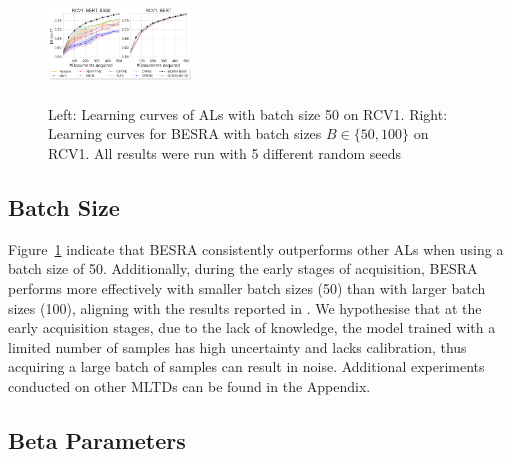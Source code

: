 \documentclass[letterpaper]{article} %
\begin{document}
\begin{figure}[!ht]
\centering
\includegraphics[width=0.33840000000000003\textwidth,height=1.18in ]{figures/batchsize_mircof1_2_v1.png}
\caption{
Left: Learning curves of ALs with batch size 50 on RCV1. Right: Learning curves for BESRA with batch sizes $B \in  \{50, 100\}$ on RCV1. All results were run with 5 different random seeds}
\label{fig:batchsize_mircof1_2}
\end{figure}

\vspace{-1.65mm}
\vspace{-3.30mm}
\subsection{Batch Size}
Figure~\ref{fig:batchsize_mircof1_2} indicate that BESRA consistently outperforms other ALs when using a batch size of 50.
Additionally, during the early stages of acquisition, BESRA performs more effectively with smaller batch sizes (50) than with larger batch sizes (100), aligning with the results reported in \cite{TanDuBun-IEEEPAMI23, NEURIPS2019_95323660}.
We hypothesise that at the early acquisition stages, due to the lack of knowledge, the model trained with a limited number of samples has high uncertainty and lacks calibration, thus acquiring a large batch of samples can result in noise. Additional experiments conducted on other MLTDs can be found in the Appendix.


\vspace{-0.76mm}
\subsection{Beta Parameters}
\end{document}
